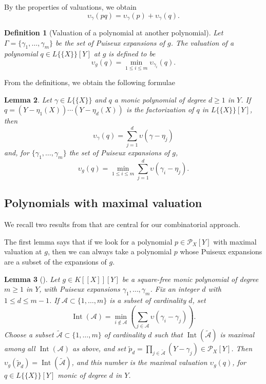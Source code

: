 \documentclass[a4paper,11pt]{amsart}%
\theoremstyle{definition}
\theoremstyle{plain}
\newtheorem{defn}{Definition}[section]
\newtheorem{lemma}[defn]{Lemma}
\theoremstyle{remark}
\DeclareMathOperator{\Int}{Int}
\begin{document}
By the properties of valuations, we obtain
$$
\upsilon_{\gamma}(pq)= \upsilon_{\gamma}(p) + \upsilon_{\gamma}(q).
$$




\begin{defn}[Valuation of a polynomial at another polynomial]
Let $\Gamma=\{\gamma_{1},\dots,\gamma_{m}\}$ be the set of Puiseux
expansions of $g$. The {\emph{valuation}} of a polynomial $q\in L\{\{X\}\}[Y]$
at $g$ is defined to be
$$\upsilon_{g}(q)=\min_{1 \leq i \leq m} \upsilon_{\gamma_{i}}(q).$$
\end{defn}

From the definitions, we obtain the following formulae

\begin{lemma}
\label{lemma:gammaAtq}
Let $\gamma \in L\{\{X\}\}$ and $q$ a monic polynomial of degree $d\geq 1$ in $Y$.  %
If $q=(Y-\eta_{1}(X))\cdots(Y-\eta_{d}(X))$ is the factorization of $q$ in $L\{\{X\}\}[Y]$, then
\[
\upsilon_{\gamma}(q)= \sum_{j=1}^{d}\upsilon(\gamma-\eta_{j})
\]
and, for $\{\gamma_{1},\dots,\gamma_{m}\}$ the set of Puiseux expansions of $g$,
\[
\upsilon_{g}(q)=\min_{1 \leq i \leq m}\sum_{j=1}^{d}\upsilon(\gamma_{i}-\eta_{j})\text{.}%
\]
\end{lemma}

\subsection{Polynomials with maximal valuation}
We recall two results from \cite{intbas} that are central for our combinatorial approach.

The first lemma says that if we look for a polynomial $p \in {\mathcal{P}_{X}}[Y]$ with maximal valuation at $g$, then we can always take a polynomial $p$ whose Puiseux expansions are a subset of the expansions of $g$.

\begin{lemma}[{\cite[Lemma 21]{intbas}}]
\label{lemma:intA} Let $g\in K[[X]][Y]$ be a square-free monic polynomial of degree
$m\geq 1$ in $Y$, with Puiseux expansions $\gamma_{1}, \dots, \gamma_{m}$. Fix
an integer $d$ with $1\leq d \leq m-1$. If $\mathcal{A}\subset\{1,\dots,m\}$ is
a subset of cardinality $d$, set
\[
\Int({\mathcal{A}})=\min_{i\not \in \mathcal{A}}\left(  \sum_{j\in\mathcal{A}%
}\upsilon(\gamma_{i}-\gamma_{j})\right).
\]
Choose a subset $\widetilde{\mathcal{A}}\subset\{1,\dots,m\}$ of cardinality
$d$ such that $\Int({\widetilde{\mathcal{A}}})$ is maximal among all
$\Int({\mathcal{A}})$ as above, and set $\widetilde{p}_d=\prod_{j\in
\widetilde{\mathcal{A}}}(Y-\gamma_{j})\in{\mathcal{P}_{X}}[Y]$. Then
$\upsilon_{g}(\widetilde{p}_d)=\Int({\widetilde{\mathcal{A}}})$, and this number is the
maximal valuation $\upsilon_{g}(q)$, for
$q\in L\{\{X\}\}[Y]$ monic of degree $d$ in $Y$.
\end{lemma}
\end{document}
